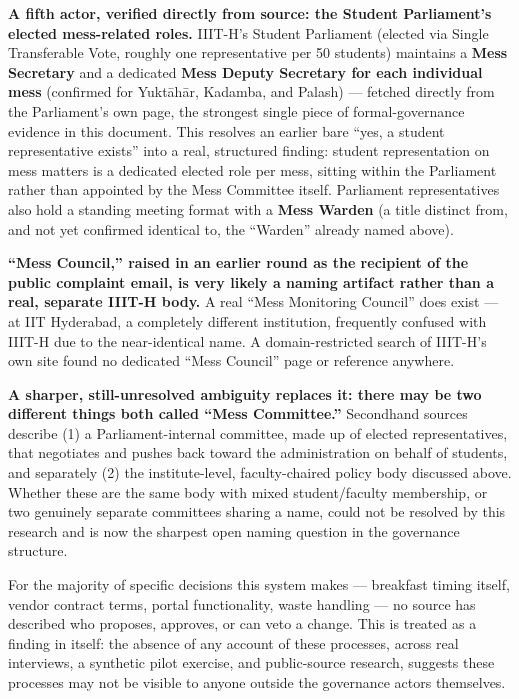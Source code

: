 \documentclass[11pt]{article}
\begin{document}
\textbf{A fifth actor, verified directly from source: the Student Parliament's elected
mess-related roles.} IIIT-H's Student Parliament (elected via Single Transferable
Vote, roughly one representative per 50 students) maintains a \textbf{Mess Secretary}
and a dedicated \textbf{Mess Deputy Secretary for each individual mess} (confirmed for
Yukt\={a}h\={a}r, Kadamba, and Palash) --- fetched directly from the Parliament's own
page, the strongest single piece of formal-governance evidence in this document. This
resolves an earlier bare ``yes, a student representative exists'' into a real,
structured finding: student representation on mess matters is a dedicated elected role
per mess, sitting within the Parliament rather than appointed by the Mess Committee
itself. Parliament representatives also hold a standing meeting format with a
\textbf{Mess Warden} (a title distinct from, and not yet confirmed identical to, the
``Warden'' already named above).

\textbf{``Mess Council,'' raised in an earlier round as the recipient of the public
complaint email, is very likely a naming artifact rather than a real, separate IIIT-H
body.} A real ``Mess Monitoring Council'' does exist --- at IIT Hyderabad, a
completely different institution, frequently confused with IIIT-H due to the
near-identical name. A domain-restricted search of IIIT-H's own site found no
dedicated ``Mess Council'' page or reference anywhere.

\textbf{A sharper, still-unresolved ambiguity replaces it: there may be two different
things both called ``Mess Committee.''} Secondhand sources describe (1) a
Parliament-internal committee, made up of elected representatives, that negotiates and
pushes back toward the administration on behalf of students, and separately (2) the
institute-level, faculty-chaired policy body discussed above. Whether these are the
same body with mixed student/faculty membership, or two genuinely separate committees
sharing a name, could not be resolved by this research and is now the sharpest open
naming question in the governance structure.

For the majority of specific decisions this system makes --- breakfast timing itself,
vendor contract terms, portal functionality, waste handling --- no source has
described who proposes, approves, or can veto a change. This is treated as a finding
in itself: the absence of any account of these processes, across real interviews, a
synthetic pilot exercise, and public-source research, suggests these processes may not
be visible to anyone outside the governance actors themselves.
\end{document}
